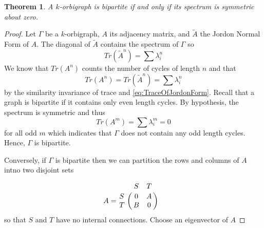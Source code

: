 \documentclass[12pt]{article}
\theoremstyle{plain}
\newtheorem{theorem}{Theorem}
\theoremstyle{definition}
\theoremstyle{remark}
\begin{document}
    \begin{theorem}\label{thm:BipartiteSymmetry}
      A $k$-orbigraph is bipartite if and only if its spectrum is symmetric about zero.
    \end{theorem}
    \begin{proof}
      Let $\Gamma$ be a $k$-orbigraph, $A$ its adjacency matrix, and $\tilde{A}$ the Jordon Normal Form of $A$. The diagonal of $\tilde{A}$ contains the spectrum of $\Gamma$ so
        \begin{equation} \label{eq:TraceOfJordonForm}
          Tr(\tilde{A}^n) = \sum \lambda_i^n
        \end{equation}
      We know that $Tr(A^n)$ counts the number of cycles of length $n$ and that
        \begin{equation*}
          Tr(A^n) = Tr(\tilde{A}^n) = \sum \lambda_i^n
        \end{equation*}
      by the similarity invariance of trace and \ref{eq:TraceOfJordonForm}. Recall that a graph is bipartite if it contains only even length cycles. By hypothesis, the spectrum is symmetric and thus
        \begin{equation*}
          Tr(A^m) = \sum \lambda_i^m = 0
        \end{equation*}
      for all odd $m$ which indicates that $\Gamma$ does not contain any odd length cycles. Hence, $\Gamma$ is bipartite.

      Conversely, if $\Gamma$ is bipartite then we can partition the rows and columns of $A$ intno two disjoint sets

      $$
    A = 
      \bordermatrix {
          & S & T  \cr
        S & 0 & A  \cr
        T & B & 0
      } \ \ 
      $$
      so that $S$ and $T$ have no internal connections. Choose an eigenvector of $A$


\end{proof}
\end{document}
